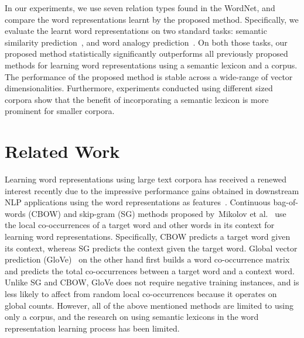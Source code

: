 \documentclass[letterpaper]{article}
\begin{document}
In our experiments, we use seven relation types found in the WordNet, and compare the word representations
learnt by the proposed method.
Specifically, we evaluate the learnt word representations on two standard tasks:
semantic similarity prediction~\cite{Bollegala:NAACL:2007}, and word analogy prediction~\cite{Duc:AAAI:2011}.
On both those tasks, our proposed method statistically significantly outperforms all 
previously proposed methods for learning word representations using a semantic lexicon and a corpus.
The performance of the proposed method is stable across a wide-range of vector dimensionalities.
Furthermore, experiments conducted using different sized corpora show that the benefit of incorporating a semantic lexicon
is more prominent for smaller corpora.


\section{Related Work}
\label{sec:related}



Learning word representations using large text corpora has received a renewed interest recently due to the
impressive performance gains obtained in downstream NLP applications using the word representations as features~\cite{Collobert:2011,Turian:ACL:2010}.
Continuous bag-of-words (CBOW)  and skip-gram (SG) methods proposed by~Mikolov et al.~\cite{Milkov:2013}
use the local co-occurrences of a target word and other words in its context for learning word representations.
Specifically, CBOW predicts a target word given its context, whereas SG predicts the context given the target word.
Global vector prediction (GloVe)~\cite{Pennington:EMNLP:2014} on the other hand first builds a word co-occurrence
matrix and predicts the total co-occurrences between a target word and a context word.
Unlike SG and CBOW, GloVe does not require negative training instances, and is less likely to affect from random local
co-occurrences because it operates on global counts. 
However, all of the above mentioned methods are limited to using only a corpus, and
the research on using semantic lexicons in the word representation learning process has been limited.
\end{document}

